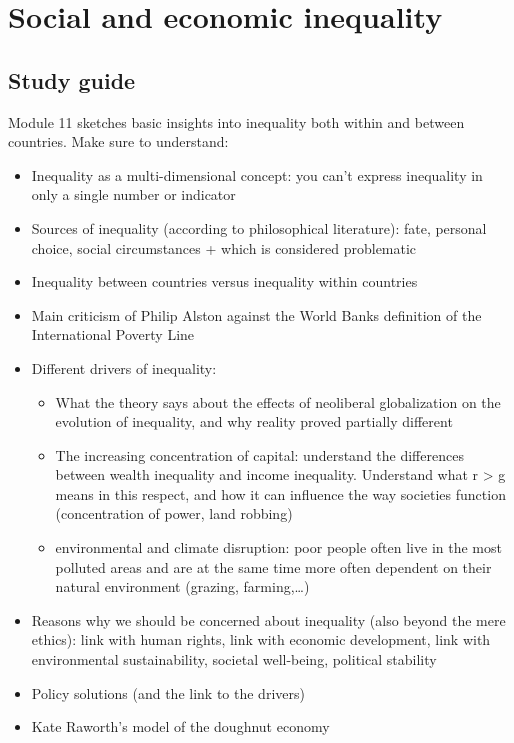 \documentclass[../summary.tex]{subfiles}
\begin{document}
	
	\section{Social and economic inequality}
	
	\subsection{Study guide}
	
	Module 11 sketches basic insights into inequality both within and between countries. Make sure to understand:
	\begin{itemize}
		\item Inequality as a multi-dimensional concept: you can't express inequality in only a single number or indicator
		\item Sources of inequality (according to philosophical literature): fate, personal choice, social circumstances + which is considered problematic
		\item Inequality between countries versus inequality within countries
		\item Main criticism of Philip Alston against the World Banks 
		definition of the International Poverty Line
		\item Different drivers of inequality:
		\begin{itemize}
			\item What the theory says about the effects of neoliberal globalization on the evolution of inequality, and why reality proved partially different
			\item The increasing concentration of capital: understand the differences between wealth inequality and income inequality. Understand what r > g means in this respect, and how it can influence the way societies function (concentration of power, land robbing)
			\item environmental and climate disruption: poor people often live in the most polluted areas and are at the same time more often dependent on their natural environment (grazing, farming,…)
		\end{itemize}
		\item Reasons why we should be concerned about inequality (also beyond the mere ethics): link with human rights, link with economic development, link with environmental sustainability, societal well-being, political stability
		\item Policy solutions (and the link to the drivers)
		\item Kate Raworth's model of the doughnut economy 
	\end{itemize}
	
\end{document}
